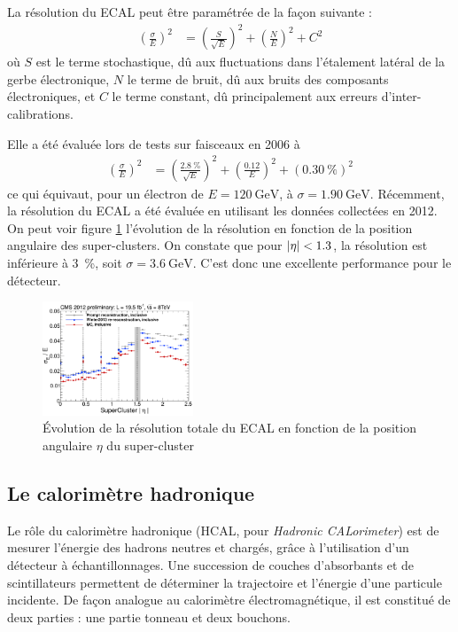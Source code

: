 \bigskip

La résolution du ECAL peut être paramétrée de la façon suivante :
\begin{align*}
  \left( \frac{\sigma}{E} \right)^2 &= \left( \frac{S}{\sqrt{E}} \right)^2 + \left( \frac{N}{E} \right)^2 + C^2
\end{align*}
où $S$ est le terme stochastique, dû aux fluctuations dans l'étalement latéral de la gerbe électronique, $N$ le terme de bruit, dû aux bruits des composants électroniques, et $C$ le terme constant, dû principalement aux erreurs d'inter-calibrations.

Elle a été évaluée lors de tests sur faisceaux en 2006 à
\begin{align*}
  \left( \frac{\sigma}{E} \right)^2 &= \left( \frac{\SI{2.8}{\%}}{\sqrt{E}} \right)^2 + \left( \frac{\num{0.12}}{E} \right)^2 + \left(\SI{0.30}{\%}\right)^2
\end{align*}
ce qui équivaut, pour un électron de $E = \SI{120}{\GeV}$, à $\sigma = \SI{1.90}{\GeV}$. Récemment, la résolution du ECAL a été évaluée en utilisant les données collectées en 2012. On peut voir figure \ref{fig:ecal_resolution} l'évolution de la résolution en fonction de la position angulaire des super-clusters. On constate que pour $\lvert \eta \rvert < 1.3$, la résolution est inférieure à \SI{3}{\%}, soit $\sigma = \SI{3.6}{\GeV}$. C'est donc une excellente performance pour le détecteur.

\begin{figure} \centering
  \includegraphics[width=0.4\textwidth]{chapitre2/figs/ecal_resolution.pdf}
  \caption{Évolution de la résolution totale du ECAL en fonction de la position angulaire $\eta$ du super-cluster}
  \label{fig:ecal_resolution}
\end{figure}

\subsection{Le calorimètre hadronique} \label{sec:hcal}

Le rôle du calorimètre hadronique (HCAL, pour \emph{Hadronic CALorimeter}) est de mesurer l'énergie des hadrons neutres et chargés, grâce à l'utilisation d'un détecteur à échantillonnages. Une succession de couches d'absorbants et de scintillateurs permettent de déterminer la trajectoire et l'énergie d'une particule incidente. De façon analogue au calorimètre électromagnétique, il est constitué de deux parties : une partie tonneau et deux bouchons.

